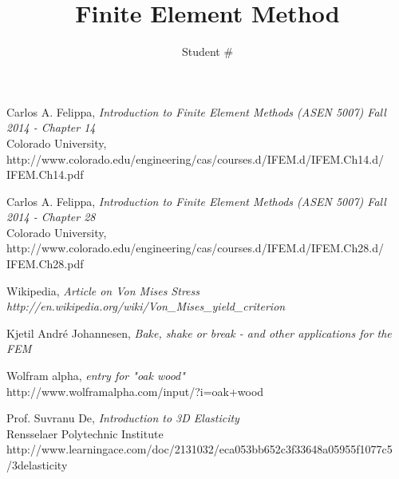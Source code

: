\documentclass[9pt]{extarticle}
\title{Finite Element Method}
\author{Student \# }
\begin{document}
\maketitle





























\newpage
\begin{thebibliography}{3}

	Carlos A. Felippa, \emph{Introduction to Finite Element Methods (ASEN 5007) Fall 2014  - Chapter 14} \\
	 Colorado University, \\	http://www.colorado.edu/engineering/cas/courses.d/IFEM.d/IFEM.Ch14.d/\\IFEM.Ch14.pdf



Carlos A. Felippa, \emph{Introduction to Finite Element Methods (ASEN 5007) Fall 2014  - Chapter 28} \\	
 Colorado University, \\	http://www.colorado.edu/engineering/cas/courses.d/IFEM.d/IFEM.Ch28.d/\\IFEM.Ch28.pdf


Wikipedia, \emph{Article on Von Mises Stress} \\
\emph{http://en.wikipedia.org/wiki/Von\_Mises\_yield\_criterion}

Kjetil André Johannesen, 
\emph{Bake, shake or break - and other applications for the FEM}

	Wolfram alpha, \emph{entry for "oak wood"}\\
	http://www.wolframalpha.com/input/?i=oak+wood
	
	Prof. Suvranu De, \emph{Introduction to 3D Elasticity} \\
	Rensselaer Polytechnic Institute \\
	http://www.learningace.com/doc/2131032/eca053bb652c3f33648a05955f1077c5\\/3delasticity


\end{thebibliography}
\end{document}
